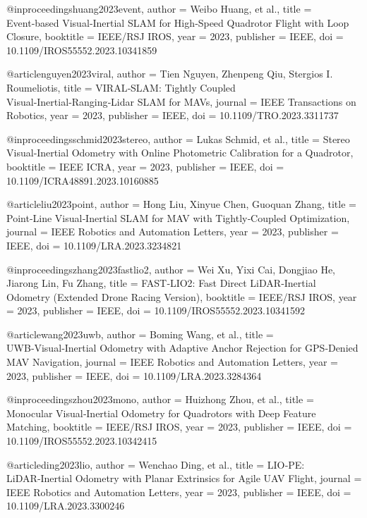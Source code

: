 @inproceedings{huang2023event,
  author = {Weibo Huang, et al.},
  title = {Event‑based Visual‑Inertial SLAM for High‑Speed Quadrotor Flight with Loop Closure},
  booktitle = {IEEE/RSJ IROS},
  year = {2023},
  publisher = {IEEE},
  doi = {10.1109/IROS55552.2023.10341859}
}

@article{nguyen2023viral,
  author = {Tien Nguyen, Zhenpeng Qiu, Stergios I. Roumeliotis},
  title = {VIRAL‑SLAM: Tightly Coupled Visual‑Inertial‑Ranging‑Lidar SLAM for MAVs},
  journal = {IEEE Transactions on Robotics},
  year = {2023},
  publisher = {IEEE},
  doi = {10.1109/TRO.2023.3311737}
}

@inproceedings{schmid2023stereo,
  author = {Lukas Schmid, et al.},
  title = {Stereo Visual‑Inertial Odometry with Online Photometric Calibration for a Quadrotor},
  booktitle = {IEEE ICRA},
  year = {2023},
  publisher = {IEEE},
  doi = {10.1109/ICRA48891.2023.10160885}
}

@article{liu2023point,
  author = {Hong Liu, Xinyue Chen, Guoquan Zhang},
  title = {Point‑Line Visual‑Inertial SLAM for MAV with Tightly‑Coupled Optimization},
  journal = {IEEE Robotics and Automation Letters},
  year = {2023},
  publisher = {IEEE},
  doi = {10.1109/LRA.2023.3234821}
}

@inproceedings{zhang2023fastlio2,
  author = {Wei Xu, Yixi Cai, Dongjiao He, Jiarong Lin, Fu Zhang},
  title = {FAST‑LIO2: Fast Direct LiDAR‑Inertial Odometry (Extended Drone Racing Version)},
  booktitle = {IEEE/RSJ IROS},
  year = {2023},
  publisher = {IEEE},
  doi = {10.1109/IROS55552.2023.10341592}
}

@article{wang2023uwb,
  author = {Boming Wang, et al.},
  title = {UWB‑Visual‑Inertial Odometry with Adaptive Anchor Rejection for GPS‑Denied MAV Navigation},
  journal = {IEEE Robotics and Automation Letters},
  year = {2023},
  publisher = {IEEE},
  doi = {10.1109/LRA.2023.3284364}
}

@inproceedings{zhou2023mono,
  author = {Huizhong Zhou, et al.},
  title = {Monocular Visual‑Inertial Odometry for Quadrotors with Deep Feature Matching},
  booktitle = {IEEE/RSJ IROS},
  year = {2023},
  publisher = {IEEE},
  doi = {10.1109/IROS55552.2023.10342415}
}

@article{ding2023lio,
  author = {Wenchao Ding, et al.},
  title = {LIO‑PE: LiDAR‑Inertial Odometry with Planar Extrinsics for Agile UAV Flight},
  journal = {IEEE Robotics and Automation Letters},
  year = {2023},
  publisher = {IEEE},
  doi = {10.1109/LRA.2023.3300246}
}

